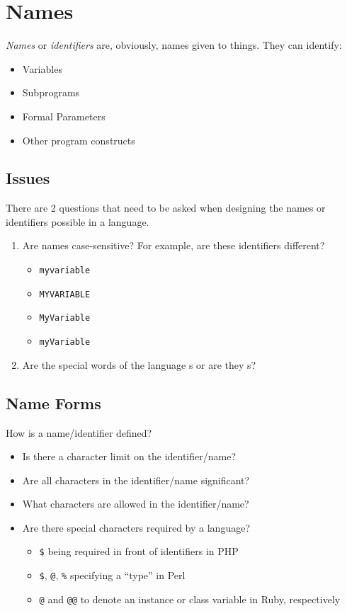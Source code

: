 \section{Names}\label{sec:Names}
\emph{Names} or \emph{identifiers} are, obviously, names given to things.
They can identify:
\begin{itemize}[noitemsep]
\item Variables
\item Subprograms
\item Formal Parameters
\item Other program constructs
\end{itemize}

\subsection{Issues}\label{subsec:Names_Issues}
There are 2 questions that need to be asked when designing the names or identifiers possible in a language.
\begin{enumerate}[noitemsep]
\item Are names case-sensitive? For example, are these identifiers different?
  \begin{itemize}[noitemsep]
  \item \texttt{myvariable}
  \item \texttt{MYVARIABLE}
  \item \texttt{MyVariable}
  \item \texttt{myVariable}
  \end{itemize}
\item Are the special words of the language s or are they s?
\end{enumerate}

\subsection{Name Forms}\label{subsec:Name_Forms}
How is a name/identifier defined?
\begin{itemize}[noitemsep]
\item Is there a character limit on the identifier/name?
\item Are all characters in the identifier/name significant?
\item What characters are allowed in the identifier/name?
\item Are there special characters required by a language?
  \begin{itemize}[noitemsep]
  \item \texttt{\$} being required in front of identifiers in PHP
  \item \texttt{\$}, \texttt{@}, \texttt{\%} specifying a ``type''  in Perl
  \item \texttt{@} and \texttt{@@} to denote an instance or class variable in Ruby, respectively
  \end{itemize}
\end{itemize}

